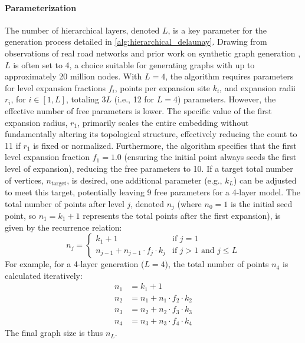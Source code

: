 \paragraph{Parameterization}
The number of hierarchical layers, denoted \(L\), is a key parameter for the generation process detailed in \cref{alg:hierarchical_delaunay}.
Drawing from observations of real road networks and prior work on synthetic graph generation \cite{hutchison_synthetic_2010}, \(L\) is often set to 4, a choice suitable for generating graphs with up to approximately 20 million nodes.
With \(L=4\), the algorithm requires parameters for level expansion fractions \(f_i\), points per expansion site \(k_i\), and expansion radii \(r_i\), for \(i \in [1, L]\), totaling \(3L\) (i.e., 12 for \(L=4\)) parameters.
However, the effective number of free parameters is lower.
The specific value of the first expansion radius, \(r_1\), primarily scales the entire embedding without fundamentally altering its topological structure, effectively reducing the count to 11 if \(r_1\) is fixed or normalized.
Furthermore, the algorithm specifies that the first level expansion fraction \(f_1 = 1.0\) (ensuring the initial point always seeds the first level of expansion), reducing the free parameters to 10.
If a target total number of vertices, \(n_{\text{target}}\), is desired, one additional parameter (e.g., \(k_L\)) can be adjusted to meet this target, potentially leaving 9 free parameters for a 4-layer model.
The total number of points after level \(j\), denoted \(n_j\) (where \(n_0=1\) is the initial seed point, so \(n_1 = k_1 + 1\) represents the total points after the first expansion), is given by the recurrence relation:
\[
	n_j =
	\begin{cases}
		k_1 + 1                               & \text{if } j=1                        \\
		n_{j-1} + n_{j-1} \cdot f_j \cdot k_j & \text{if } j > 1 \text{ and } j \le L
	\end{cases}
\]
For example, for a 4-layer generation (\(L=4\)), the total number of points \(n_4\) is calculated iteratively:
\begin{align*}
	n_1 & = k_1 + 1                       \\
	n_2 & = n_1 + n_1 \cdot f_2 \cdot k_2 \\
	n_3 & = n_2 + n_2 \cdot f_3 \cdot k_3 \\
	n_4 & = n_3 + n_3 \cdot f_4 \cdot k_4
\end{align*}
The final graph size is thus \(n_L\).

